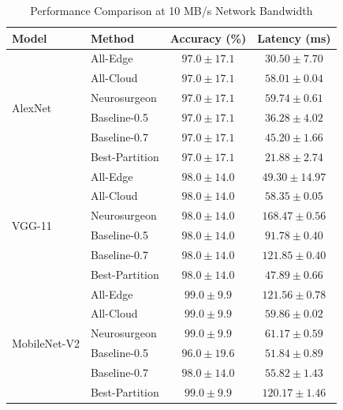 \begin{table}[htbp]
\centering
\caption{Performance Comparison at 10 MB/s Network Bandwidth}
\label{tab:main_results}
\begin{tabular}{llcc}
\toprule
\textbf{Model} & \textbf{Method} & \textbf{Accuracy (\%)} & \textbf{Latency (ms)} \\
\midrule
\multirow{6}{*}{AlexNet}
 & All-Edge & $97.0 \pm 17.1$ & $30.50 \pm 7.70$ \\
& All-Cloud & $97.0 \pm 17.1$ & $58.01 \pm 0.04$ \\
& Neurosurgeon & $97.0 \pm 17.1$ & $59.74 \pm 0.61$ \\
& Baseline-0.5 & $97.0 \pm 17.1$ & $36.28 \pm 4.02$ \\
& Baseline-0.7 & $97.0 \pm 17.1$ & $45.20 \pm 1.66$ \\
& Best-Partition & $97.0 \pm 17.1$ & $21.88 \pm 2.74$ \\
\midrule
\multirow{6}{*}{VGG-11}
 & All-Edge & $98.0 \pm 14.0$ & $49.30 \pm 14.97$ \\
& All-Cloud & $98.0 \pm 14.0$ & $58.35 \pm 0.05$ \\
& Neurosurgeon & $98.0 \pm 14.0$ & $168.47 \pm 0.56$ \\
& Baseline-0.5 & $98.0 \pm 14.0$ & $91.78 \pm 0.40$ \\
& Baseline-0.7 & $98.0 \pm 14.0$ & $121.85 \pm 0.40$ \\
& Best-Partition & $98.0 \pm 14.0$ & $47.89 \pm 0.66$ \\
\midrule
\multirow{6}{*}{MobileNet-V2}
 & All-Edge & $99.0 \pm 9.9$ & $121.56 \pm 0.78$ \\
& All-Cloud & $99.0 \pm 9.9$ & $59.86 \pm 0.02$ \\
& Neurosurgeon & $99.0 \pm 9.9$ & $61.17 \pm 0.59$ \\
& Baseline-0.5 & $96.0 \pm 19.6$ & $51.84 \pm 0.89$ \\
& Baseline-0.7 & $98.0 \pm 14.0$ & $55.82 \pm 1.43$ \\
& Best-Partition & $99.0 \pm 9.9$ & $120.17 \pm 1.46$ \\
\bottomrule
\end{tabular}
\end{table}